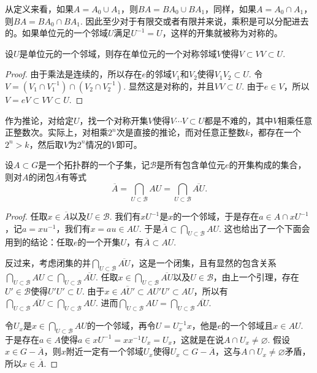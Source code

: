 从定义来看，如果$A=A_0\cup A_1$，则$BA=BA_0\cup BA_1$，同样，如果$A=A_0\cap A_1$，则$BA=BA_0\cap BA_1$. 因此至少对于有限交或者有限并来说，乘积是可以分配进去的。如果单位元的一个邻域$U$满足$U^{-1}=U$，这样的开集就被称为对称的。

\begin{lem}
设$U$是单位元的一个邻域，则存在单位元的一个对称邻域$V$使得$V\subset VV\subset U$. 
\end{lem}

\begin{proof}
	由于乘法是连续的，所以存在$e$的邻域$V_1$和$V_2$使得$V_1V_2\subset U$. 令$V=(V_1\cap V_1^{-1})\cap (V_2\cap V_2^{-1})$. 显然这是对称的，并且$VV\subset U$. 由于$e\in V$，所以$V=eV\subset VV\subset U$.
\end{proof}

作为推论，对给定$U$，找一个对称开集$V$使得$V\cdots V\subset U$都是不难的，其中$V$相乘任意正整数次。实际上，对相乘$2^n$次是直接的推论，而对任意正整数$k$，都存在一个$2^n>k$，然后取$V$为$2^n$情况的$V$即可。

\begin{lem}\label{lem:2}
设$A\subset G$是一个拓扑群的一个子集，记$\mathscr{B}$是所有包含单位元$e$的开集构成的集合，则对$A$的闭包$\overline{A}$有等式
\[
	\overline{A}=\bigcap_{U\subset \mathscr{B}}AU=\bigcap_{U\subset \mathscr{B}}\overline{AU}.
\]
\end{lem}

\begin{proof}
	任取$x\in \overline{A}$以及$U\in \mathscr{B}$. 我们有$xU^{-1}$是$x$的一个邻域，于是存在$a\in A\cap x U^{-1}$，记$a=xu^{-1}$，我们有$x=au\in AU$. 于是$\overline{A}\subset \bigcap_{U\subset \mathscr{B}}AU$. 这也给出了一个下面会用到的结论：任取$e$的一个开集$U$，有$\overline{A}\subset AU$.

	反过来，考虑闭集的并$\bigcap_{U\subset \mathscr{B}}\overline{AU}$，这是一个闭集，且有显然的包含关系$\bigcap_{U\subset \mathscr{B}}AU\subset \bigcap_{U\subset \mathscr{B}}\overline{AU}$. 任取$x\in \bigcap_{U\subset \mathscr{B}}\overline{AU}$以及$U\in \mathscr{B}$，由上一个引理，存在$U'\in \mathscr{B}$使得$U'U'\subset U$. 由于$x\in \overline{AU'}\subset AU'U'\subset AU$，所以有$\bigcap_{U\subset \mathscr{B}}\overline{AU}\subset \bigcap_{U\subset \mathscr{B}}AU$. 进而$\bigcap_{U\subset \mathscr{B}}AU=\bigcap_{U\subset \mathscr{B}}\overline{AU}$.

	令$U_x$是$x\in \bigcap_{U\subset \mathscr{B}}AU$的一个邻域，再令$U=U_x^{-1}x$，他是$e$的一个邻域且$x\in AU$. 于是存在$a\in A$使得$a\in xU^{-1}=xx^{-1}U_x=U_x$，这就是在说$A\cap U_x\neq \varnothing$. 假设$x\in G-\overline{A}$，则$x$附近一定有一个邻域$U_x$使得$U_x\subset G-\overline{A}$，这与$A\cap U_x\neq \varnothing$矛盾，所以$x\in \overline{A}$.
\end{proof}

